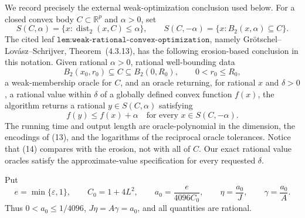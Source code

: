 We record precisely the external weak-optimization conclusion used below.  For a closed convex body \(C\subset\mathbb R^p\) and \(\alpha>0\), set
\[
 S(C,\alpha)=\{x:\operatorname{dist}_2(x,C)\le\alpha\},
 \qquad
 S(C,-\alpha)=\{x:B_2(x,\alpha)\subseteq C\}.
\tag{12}
\]
The cited leaf \(\texttt{lem:weak-rational-convex-optimization}\), namely Gr\"otschel--Lov\'asz--Schrijver, Theorem~(4.3.13), has the following erosion-based conclusion in this notation.  Given rational \(\alpha>0\), rational well-bounding data
\[
 B_2(x_0,r_0)\subseteq C\subseteq B_2(0,R_0),
 \qquad 0<r_0\le R_0,
\tag{13}
\]
a weak-membership oracle for \(C\), and an oracle returning, for rational \(x\) and \(\delta>0\), a rational value within \(\delta\) of a globally defined convex function \(f(x)\), the algorithm returns a rational \(y\in S(C,\alpha)\) satisfying
\[
 f(y)\le f(x)+\alpha
 \quad\text{for every }x\in S(C,-\alpha).
\tag{14}
\]
The running time and output length are oracle-polynomial in the dimension, the encodings of (13), and the logarithms of the reciprocal oracle tolerances.  Notice that (14) compares with the erosion, not with all of \(C\).  Our exact rational value oracles satisfy the approximate-value specification for every requested \(\delta\).

Put
\[
 e=\min\{\varepsilon,1\},
 \qquad C_0=1+4L^2,
 \qquad a_0=\frac{e}{4096C_0},
 \qquad \eta=\frac{a_0}{J},
 \qquad \gamma=\frac{a_0}{A}.
\tag{15}
\]
Thus \(0<a_0\le1/4096\), \(J\eta=A\gamma=a_0\), and all quantities are rational.

